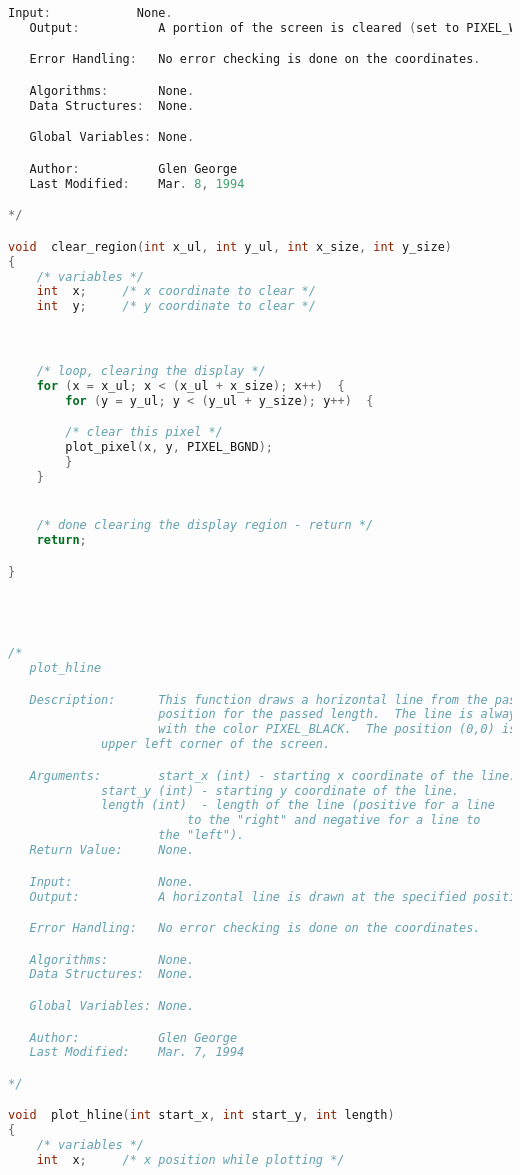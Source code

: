 \begin{lstlisting}[language=C]
   Input:            None.
   Output:           A portion of the screen is cleared (set to PIXEL_WHITE).

   Error Handling:   No error checking is done on the coordinates.

   Algorithms:       None.
   Data Structures:  None.

   Global Variables: None.

   Author:           Glen George
   Last Modified:    Mar. 8, 1994

*/

void  clear_region(int x_ul, int y_ul, int x_size, int y_size)
{
    /* variables */
    int  x;		/* x coordinate to clear */
    int  y;		/* y coordinate to clear */



    /* loop, clearing the display */
    for (x = x_ul; x < (x_ul + x_size); x++)  {
        for (y = y_ul; y < (y_ul + y_size); y++)  {

	    /* clear this pixel */
	    plot_pixel(x, y, PIXEL_BGND);
        }
    }


    /* done clearing the display region - return */
    return;

}




/*
   plot_hline

   Description:      This function draws a horizontal line from the passed
                     position for the passed length.  The line is always drawn
                     with the color PIXEL_BLACK.  The position (0,0) is the
		     upper left corner of the screen.

   Arguments:        start_x (int) - starting x coordinate of the line.
   		     start_y (int) - starting y coordinate of the line.
		     length (int)  - length of the line (positive for a line
		     		     to the "right" and negative for a line to
				     the "left").
   Return Value:     None.

   Input:            None.
   Output:           A horizontal line is drawn at the specified position.

   Error Handling:   No error checking is done on the coordinates.

   Algorithms:       None.
   Data Structures:  None.

   Global Variables: None.

   Author:           Glen George
   Last Modified:    Mar. 7, 1994

*/

void  plot_hline(int start_x, int start_y, int length)
{
    /* variables */
    int  x;		/* x position while plotting */


\end{lstlisting}
